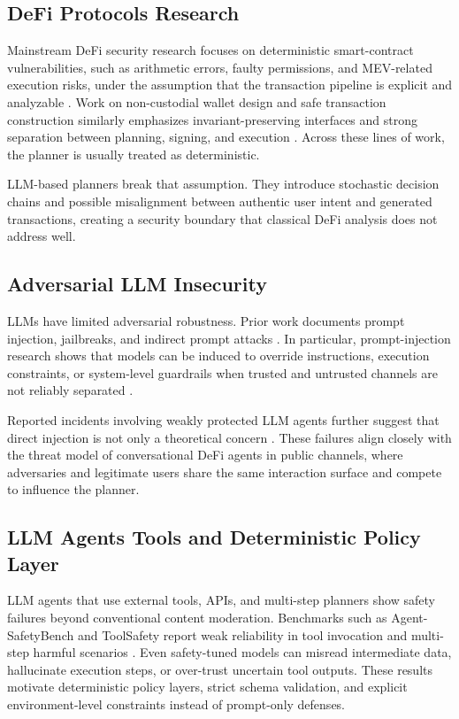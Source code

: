 ﻿\documentclass[conference]{IEEEtran}
\begin{document}
\subsection{DeFi Protocols Research}

Mainstream DeFi security research focuses on deterministic smart-contract
vulnerabilities, such as arithmetic errors, faulty permissions, and
MEV-related execution risks, under the assumption that the transaction
pipeline is explicit and analyzable \cite{10.1016/j.eswa.2025.128431}. Work on
non-custodial wallet design and safe transaction construction similarly
emphasizes invariant-preserving interfaces and strong separation between
planning, signing, and execution \cite{10.1016/j.eswa.2025.128431,
ERINLE2025111691}. Across these lines of work, the planner is usually treated
as deterministic.

LLM-based planners break that assumption. They introduce stochastic decision
chains and possible misalignment between authentic user intent and generated
transactions, creating a security boundary that classical DeFi analysis does
not address well.

\subsection{Adversarial LLM Insecurity}

LLMs have limited adversarial robustness. Prior work documents prompt
injection, jailbreaks, and indirect prompt attacks
\cite{pathade2025redteamingmindmachine, derner2024security}. In particular,
prompt-injection research shows that models can be induced to override
instructions, execution constraints, or system-level guardrails when trusted
and untrusted channels are not reliably separated
\cite{pathade2025redteamingmindmachine, li2025securityconcernslargelanguage}.

Reported incidents involving weakly protected LLM agents further suggest that
direct injection is not only a theoretical concern \cite{balaha2026}. These
failures align closely with the threat model of conversational DeFi agents in
public channels, where adversaries and legitimate users share the same
interaction surface and compete to influence the planner.


\subsection{LLM Agents Tools and Deterministic Policy Layer}
LLM agents that use external tools, APIs, and multi-step planners show safety
failures beyond conventional content moderation. Benchmarks such as
Agent-SafetyBench and ToolSafety report weak reliability in tool invocation and
multi-step harmful scenarios \cite{zhang2024agent, xie-etal-2025-toolsafety}.
Even safety-tuned models can misread intermediate data, hallucinate execution
steps, or over-trust uncertain tool outputs. These results motivate
deterministic policy layers, strict schema validation, and explicit
environment-level constraints instead of prompt-only defenses.
\end{document}
